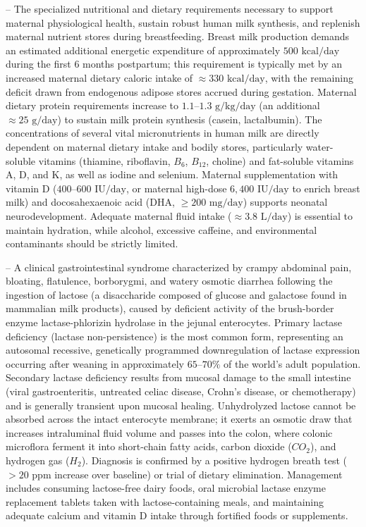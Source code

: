 -- The specialized nutritional and dietary requirements necessary to support maternal physiological health, sustain robust human milk synthesis, and replenish maternal nutrient stores during breastfeeding. Breast milk production demands an estimated additional energetic expenditure of approximately $500\text{ kcal/day}$ during the first 6 months postpartum; this requirement is typically met by an increased maternal dietary caloric intake of $\approx 330\text{ kcal/day}$, with the remaining deficit drawn from endogenous adipose stores accrued during gestation. Maternal dietary protein requirements increase to $1.1\text{--}1.3\text{ g/kg/day}$ (an additional $\approx 25\text{ g/day}$) to sustain milk protein synthesis (casein, lactalbumin). The concentrations of several vital micronutrients in human milk are directly dependent on maternal dietary intake and bodily stores, particularly water-soluble vitamins (thiamine, riboflavin, $B_6$, $B_{12}$, choline) and fat-soluble vitamins A, D, and K, as well as iodine and selenium. Maternal supplementation with vitamin D ($400\text{--}600\text{ IU/day}$, or maternal high-dose $6{,}400\text{ IU/day}$ to enrich breast milk) and docosahexaenoic acid (DHA, $\ge 200\text{ mg/day}$) supports neonatal neurodevelopment. Adequate maternal fluid intake ($\approx 3.8\text{ L/day}$) is essential to maintain hydration, while alcohol, excessive caffeine, and environmental contaminants should be strictly limited.

-- A clinical gastrointestinal syndrome characterized by crampy abdominal pain, bloating, flatulence, borborygmi, and watery osmotic diarrhea following the ingestion of lactose (a disaccharide composed of glucose and galactose found in mammalian milk products), caused by deficient activity of the brush-border enzyme lactase-phlorizin hydrolase in the jejunal enterocytes. Primary lactase deficiency (lactase non-persistence) is the most common form, representing an autosomal recessive, genetically programmed downregulation of lactase expression occurring after weaning in approximately $65\text{--}70\%$ of the world's adult population. Secondary lactase deficiency results from mucosal damage to the small intestine (viral gastroenteritis, untreated celiac disease, Crohn's disease, or chemotherapy) and is generally transient upon mucosal healing. Unhydrolyzed lactose cannot be absorbed across the intact enterocyte membrane; it exerts an osmotic draw that increases intraluminal fluid volume and passes into the colon, where colonic microflora ferment it into short-chain fatty acids, carbon dioxide ($CO_2$), and hydrogen gas ($H_2$). Diagnosis is confirmed by a positive hydrogen breath test ($>20\text{ ppm}$ increase over baseline) or trial of dietary elimination. Management includes consuming lactose-free dairy foods, oral microbial lactase enzyme replacement tablets taken with lactose-containing meals, and maintaining adequate calcium and vitamin D intake through fortified foods or supplements.

